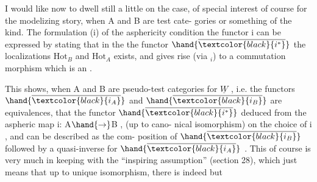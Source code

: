 I would like now to dwell still a little on the case, of special
interest of course for the modelizing story, when A and B are test cate-%
gories or something of the kind. The formulation (i) of the asphericity
condition  the functor i can be expressed by stating that in the
the functor $\hand{\overline{\textcolor{black}{i^{*}}}}$   the localizations $\mathrm{Hot}_B$ and $\mathrm{Hot}_A$ exists, and gives
rise (via \hand{$\lambda$}$_i$) to a commutation morphism which is an \hand{\uline{\textcolor{black}{isomorphism}}}
.

This shows, when A and B are pseudo-test categories for $\underline{W}$ , i.e. the
functors $\hand{\overline{\textcolor{black}{i_A}}}$ and $\hand{\overline{\textcolor{black}{i_B}}}$ are equivalences, that the functor $\hand{\overline{\textcolor{black}{i^{*}}}}$ deduced
from the aspheric  map i: A$\hand{\rightarrow}$B , \hand{\uline{\textcolor{black}{does not depend}}} (up to cano-%
nical isomorphism) on the choice of i , and can be described as the com-%
position of $\hand{\overline{\textcolor{black}{i_B}}}$ followed by a quasi-inverse for $\hand{\overline{\textcolor{black}{i_A}}}$ . This of course
is very much in keeping with the ``inspiring assumption'' (section 28),
which just means that up to unique isomorphism, there is indeed but \hand{\uline{\textcolor{black}{one}}}

